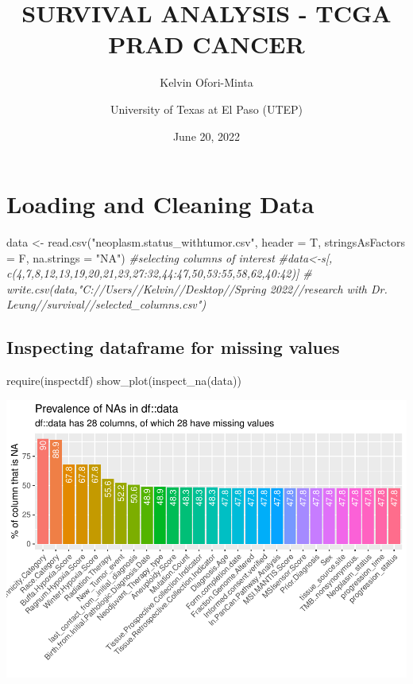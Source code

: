 \documentclass[
  11pt,
]{article}
\title{SURVIVAL ANALYSIS - TCGA PRAD CANCER}
\author{Kelvin Ofori-Minta \and University of Texas at El Paso (UTEP)}
\date{June 20, 2022}
\newenvironment{Shaded}{\begin{snugshade}}{\end{snugshade}}
\newcommand{\AttributeTok}[1]{\textcolor[rgb]{0.77,0.63,0.00}{#1}}
\newcommand{\CommentTok}[1]{\textcolor[rgb]{0.56,0.35,0.01}{\textit{#1}}}
\newcommand{\FunctionTok}[1]{\textcolor[rgb]{0.00,0.00,0.00}{#1}}
\newcommand{\NormalTok}[1]{#1}
\newcommand{\OtherTok}[1]{\textcolor[rgb]{0.56,0.35,0.01}{#1}}
\newcommand{\StringTok}[1]{\textcolor[rgb]{0.31,0.60,0.02}{#1}}
\begin{document}
\maketitle

{
\setcounter{tocdepth}{4}
\tableofcontents
}
\newpage
\section{Loading and Cleaning Data}

\begin{Shaded}
\begin{Highlighting}[]
\NormalTok{data }\OtherTok{\textless{}{-}} \FunctionTok{read.csv}\NormalTok{(}\StringTok{"neoplasm.status\_withtumor.csv"}\NormalTok{, }\AttributeTok{header =}\NormalTok{ T, }\AttributeTok{stringsAsFactors =}\NormalTok{ F,}
              \AttributeTok{na.strings =} \StringTok{"NA"}\NormalTok{)}
\CommentTok{\#selecting columns of interest}
\CommentTok{\#data\textless{}{-}s[, c(4,7,8,12,13,19,20,21,23,27:32,44:47,50,53:55,58,62,40:42)]}
\CommentTok{\# write.csv(data,"C://Users//Kelvin//Desktop//Spring 2022//research with Dr. Leung//survival//selected\_columns.csv")}
\end{Highlighting}
\end{Shaded}

\subsection{Inspecting dataframe for missing values}

\begin{Shaded}
\begin{Highlighting}[]
\FunctionTok{require}\NormalTok{(inspectdf)}
\FunctionTok{show\_plot}\NormalTok{(}\FunctionTok{inspect\_na}\NormalTok{(data))}
\end{Highlighting}
\end{Shaded}

\includegraphics{Random_new_surv_4_files/figure-latex/unnamed-chunk-2-1.pdf}
\end{document}
